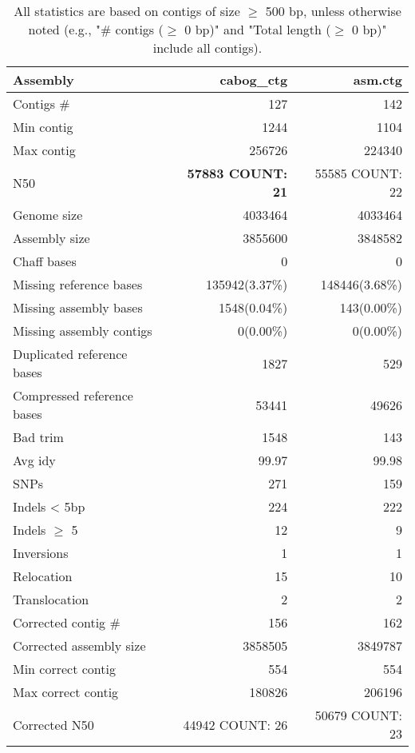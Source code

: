 \documentclass[12pt,a4paper]{article}
\begin{document}
\begin{table}[ht]
\begin{center}
\caption{All statistics are based on contigs of size $\geq$ 500 bp, unless otherwise noted (e.g., "\# contigs ($\geq$ 0 bp)" and "Total length ($\geq$ 0 bp)" include all contigs).}
\begin{tabular}{|l*{2}{|r}|}
\hline
Assembly & cabog\_ctg & asm.ctg \\ \hline
Contigs \# & 127 & 142 \\ \hline
Min contig & 1244 & 1104 \\ \hline
Max contig & 256726 & 224340 \\ \hline
N50 & {\bf 57883 COUNT: 21} & 55585 COUNT: 22 \\ \hline
Genome size & 4033464 & 4033464 \\ \hline
Assembly size & 3855600 & 3848582 \\ \hline
Chaff bases & 0 & 0 \\ \hline
Missing reference bases & 135942(3.37\%) & 148446(3.68\%) \\ \hline
Missing assembly bases & 1548(0.04\%) & 143(0.00\%) \\ \hline
Missing assembly contigs & 0(0.00\%) & 0(0.00\%) \\ \hline
Duplicated reference bases & 1827 & 529 \\ \hline
Compressed reference bases & 53441 & 49626 \\ \hline
Bad trim & 1548 & 143 \\ \hline
Avg idy & 99.97 & 99.98 \\ \hline
SNPs & 271 & 159 \\ \hline
Indels < 5bp & 224 & 222 \\ \hline
Indels $\geq$ 5 & 12 & 9 \\ \hline
Inversions & 1 & 1 \\ \hline
Relocation & 15 & 10 \\ \hline
Translocation & 2 & 2 \\ \hline
Corrected contig \# & 156 & 162 \\ \hline
Corrected assembly size & 3858505 & 3849787 \\ \hline
Min correct contig & 554 & 554 \\ \hline
Max correct contig & 180826 & 206196 \\ \hline
Corrected N50 & 44942 COUNT: 26 & 50679 COUNT: 23 \\ \hline
\end{tabular}
\end{center}
\end{table}
\end{document}
